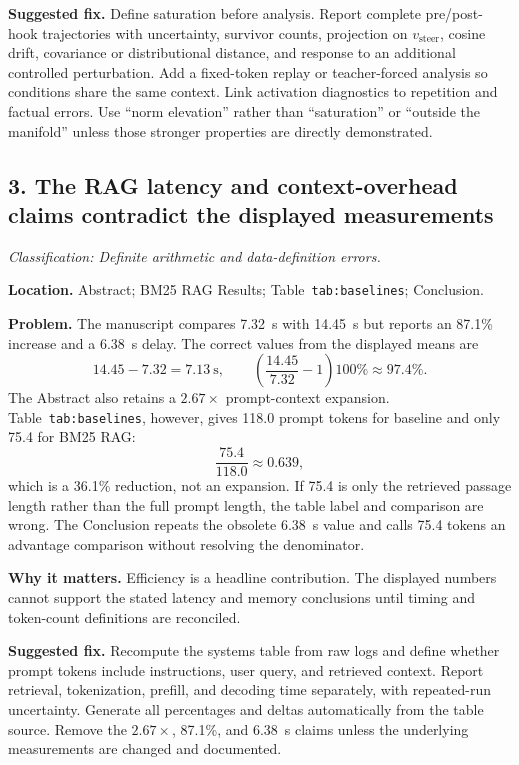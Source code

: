 \documentclass[11pt]{article}
\newcommand{\findinglabel}[1]{\textbf{#1}}
\newcommand{\classification}[1]{\textit{Classification: #1.}}
\begin{document}
\findinglabel{Suggested fix.} Define saturation before analysis.  Report complete pre/post-hook trajectories with uncertainty, survivor counts, projection on $v_{\text{steer}}$, cosine drift, covariance or distributional distance, and response to an additional controlled perturbation.  Add a fixed-token replay or teacher-forced analysis so conditions share the same context.  Link activation diagnostics to repetition and factual errors.  Use ``norm elevation'' rather than ``saturation'' or ``outside the manifold'' unless those stronger properties are directly demonstrated.

\subsection*{3. The RAG latency and context-overhead claims contradict the displayed measurements}

\classification{Definite arithmetic and data-definition errors}

\findinglabel{Location.} Abstract; BM25 RAG Results; Table~\texttt{tab:baselines}; Conclusion.

\findinglabel{Problem.} The manuscript compares 7.32~s with 14.45~s but reports an 87.1\% increase and a 6.38~s delay.  The correct values from the displayed means are
\[
14.45-7.32=7.13\ \text{s},
\qquad
\left(\frac{14.45}{7.32}-1\right)100\%\approx97.4\%.
\]
The Abstract also retains a $2.67\times$ prompt-context expansion.  Table~\texttt{tab:baselines}, however, gives 118.0 prompt tokens for baseline and only 75.4 for BM25 RAG:
\[
\frac{75.4}{118.0}\approx0.639,
\]
which is a 36.1\% reduction, not an expansion.  If 75.4 is only the retrieved passage length rather than the full prompt length, the table label and comparison are wrong.  The Conclusion repeats the obsolete 6.38~s value and calls 75.4 tokens an advantage comparison without resolving the denominator.

\findinglabel{Why it matters.} Efficiency is a headline contribution.  The displayed numbers cannot support the stated latency and memory conclusions until timing and token-count definitions are reconciled.

\findinglabel{Suggested fix.} Recompute the systems table from raw logs and define whether prompt tokens include instructions, user query, and retrieved context.  Report retrieval, tokenization, prefill, and decoding time separately, with repeated-run uncertainty.  Generate all percentages and deltas automatically from the table source.  Remove the $2.67\times$, 87.1\%, and 6.38~s claims unless the underlying measurements are changed and documented.
\end{document}

